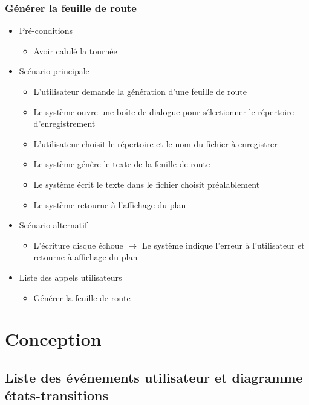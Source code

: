 \documentclass[10pt,a4paper]{book}
\begin{document}
\subsection{Générer la feuille de route}
\begin{itemize}
	\item{Pré-conditions}
	\begin{itemize}
		\item{Avoir calulé la tournée}
	\end{itemize}
	\item{Scénario principale}
	\begin{itemize}
		\item{L’utilisateur demande la génération d’une feuille de route}
		\item{Le système ouvre une boîte de dialogue pour sélectionner le répertoire d’enregistrement}
		\item{L’utilisateur choisit le répertoire et le nom du fichier à enregistrer}
		\item{Le système génère le texte de la feuille de route}
		\item{Le système écrit le texte dans le fichier choisit préalablement}
		\item{Le système retourne à l’affichage du plan}
	\end{itemize}
	\item{Scénario alternatif}
	\begin{itemize}
		\item{L’écriture disque échoue $\rightarrow$
Le système indique l’erreur à l'utilisateur et retourne à affichage du plan}
	\end{itemize}
	\item{Liste des appels utilisateurs}
	\begin{itemize}
		\item{Générer la feuille de route}
	\end{itemize}
\end{itemize}
\chapter{Conception}
\section{Liste des événements utilisateur et diagramme états-transitions}
\end{document}
